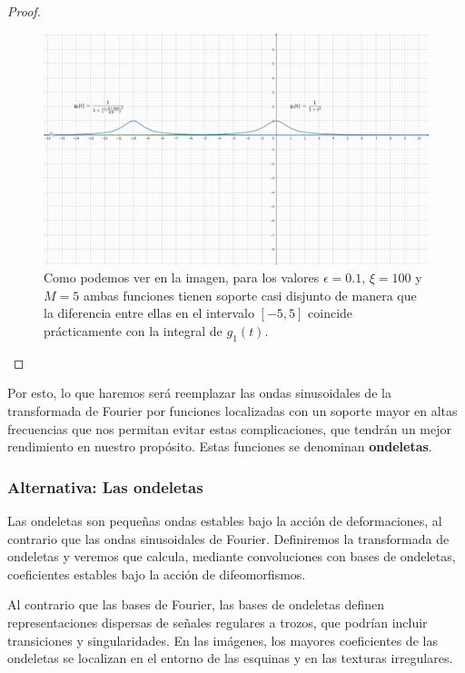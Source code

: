 \begin{proof}
\begin{figure}[!h]
  \centering
  \includegraphics[width=1.0\textwidth]{img/geogebra-export_contraejemplo_Fourier.png}
  \caption{Como podemos ver en la imagen, para los valores $\epsilon=0.1$, $\xi=100$ y $M=5$ ambas funciones tienen soporte casi disjunto de manera que la diferencia entre ellas en el intervalo $[-5,5]$ coincide prácticamente con la integral de $g_1(t)$.}
  \label{fig:Grafica_funciones}
\end{figure}

\end{proof}
    
\medskip

\noindent Por esto, lo que haremos será reemplazar las ondas sinusoidales de la transformada de Fourier por funciones localizadas con un soporte mayor en altas frecuencias que nos permitan evitar estas complicaciones, que tendrán un mejor rendimiento en nuestro propósito. Estas funciones se denominan \textbf{ondeletas}. 

\medskip

\subsubsection{Alternativa: Las ondeletas}

\noindent Las ondeletas \cite{MallatWavelets} son pequeñas ondas estables bajo la acción de deformaciones, al contrario que las ondas sinusoidales de Fourier. Definiremos la transformada de ondeletas y veremos que calcula, mediante convoluciones con bases de ondeletas, coeficientes estables bajo la acción de difeomorfismos.

\medskip

\noindent Al contrario que las bases de Fourier, las bases de ondeletas definen  representaciones dispersas de señales regulares a trozos, que podrían incluir transiciones y singularidades. En las imágenes, los mayores coeficientes de las ondeletas se localizan en el entorno de las esquinas y en las texturas irregulares.

